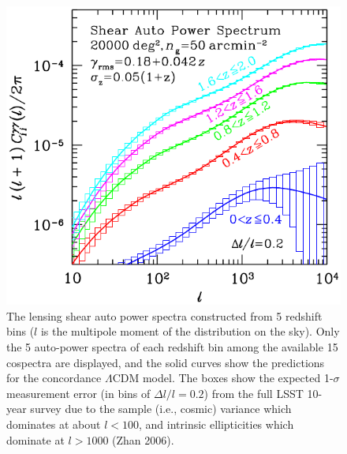 \documentclass{emulateapj}
\begin{document}
\begin{figure}
\includegraphics[width=1.0\hsize,clip]{cls.pdf}
\caption{The lensing shear auto power spectra constructed from 5 redshift bins 
($l$ is the multipole moment of the distribution on the sky). Only the 5 auto-power 
spectra of each redshift bin among the available 15 cospectra are displayed, and the 
solid curves show the predictions for the concordance $\Lambda$CDM model. The boxes 
show the expected 1-$\sigma$ measurement error (in bins of $\Delta l/l=0.2$) from the full LSST 
10-year survey due to the sample (i.e., cosmic) variance which dominates at about 
$l< 100$, and intrinsic ellipticities which dominate at $l> 1000$ (Zhan 2006).} 
\label{Fig:wlPk}
\end{figure}
\end{document}
